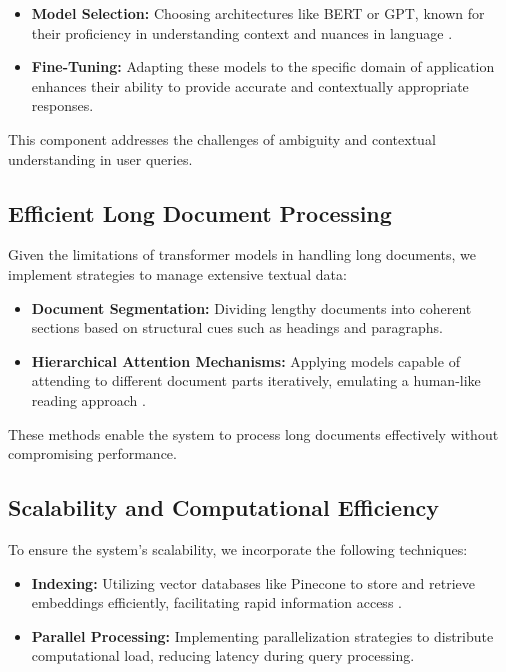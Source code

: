 \documentclass[sigconf]{acmart}
\begin{document}
\begin{itemize}
    \item \textbf{Model Selection:} Choosing architectures like BERT or GPT, known for their proficiency in understanding context and nuances in language \cite{turn0academia11}.
    \item \textbf{Fine-Tuning:} Adapting these models to the specific domain of application enhances their ability to provide accurate and contextually appropriate responses.
\end{itemize}

This component addresses the challenges of ambiguity and contextual understanding in user queries.

\subsection{Efficient Long Document Processing}

Given the limitations of transformer models in handling long documents, we implement strategies to manage extensive textual data:

\begin{itemize}
    \item \textbf{Document Segmentation:} Dividing lengthy documents into coherent sections based on structural cues such as headings and paragraphs.
    \item \textbf{Hierarchical Attention Mechanisms:} Applying models capable of attending to different document parts iteratively, emulating a human-like reading approach \cite{turn0academia11}.
\end{itemize}

These methods enable the system to process long documents effectively without compromising performance.

\subsection{Scalability and Computational Efficiency}

To ensure the system's scalability, we incorporate the following techniques:

\begin{itemize}
    \item \textbf{Indexing:} Utilizing vector databases like Pinecone to store and retrieve embeddings efficiently, facilitating rapid information access \cite{turn0search6}.
    \item \textbf{Parallel Processing:} Implementing parallelization strategies to distribute computational load, reducing latency during query processing.
\end{itemize}
\end{document}
